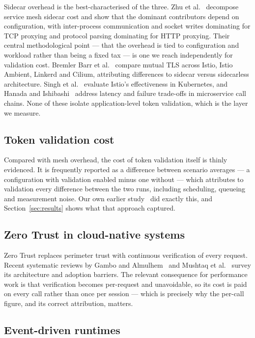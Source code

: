 \documentclass[pdflatex,sn-basic,twocolumn]{sn-jnl}
\begin{document}
Sidecar overhead is the best-characterised of the three. Zhu et
al.~\cite{zhu2023dissecting} decompose service mesh sidecar cost and show that
the dominant contributors depend on configuration, with inter-process
communication and socket writes dominating for TCP proxying and protocol parsing
dominating for HTTP proxying. Their central methodological point --- that the
overhead is tied to configuration and workload rather than being a fixed tax ---
is one we reach independently for validation cost. Bremler Barr et
al.~\cite{bremlerbarr2024mtls} compare mutual TLS across Istio, Istio Ambient,
Linkerd and Cilium, attributing differences to sidecar versus sidecarless
architecture. Singh et al.~\cite{singh2025resilient} evaluate Istio's
effectiveness in Kubernetes, and Hanada and Ishibashi~\cite{hanada2025slo}
address latency and failure trade-offs in microservice call chains. None of
these isolate application-level token validation, which is the layer we measure.

\subsection{Token validation cost}

Compared with mesh overhead, the cost of token validation itself is thinly
evidenced. It is frequently reported as a difference between scenario averages
--- a configuration with validation enabled minus one without --- which
attributes to validation every difference between the two runs, including
scheduling, queueing and measurement noise. Our own earlier
study~\cite{sikdar2026quantifying} did exactly this, and
Section~\ref{sec:results} shows what that approach captured.

\subsection{Zero Trust in cloud-native systems}

Zero Trust replaces perimeter trust with continuous verification of every
request. Recent systematic reviews by Gambo and Almulhem~\cite{gambo2025zta} and
Mushtaq et al.~\cite{mushtaq2025zta} survey its architecture and adoption
barriers. The relevant consequence for performance work is that verification
becomes per-request and unavoidable, so its cost is paid on every call rather
than once per session --- which is precisely why the per-call figure, and its
correct attribution, matters.

\subsection{Event-driven runtimes}
\end{document}
